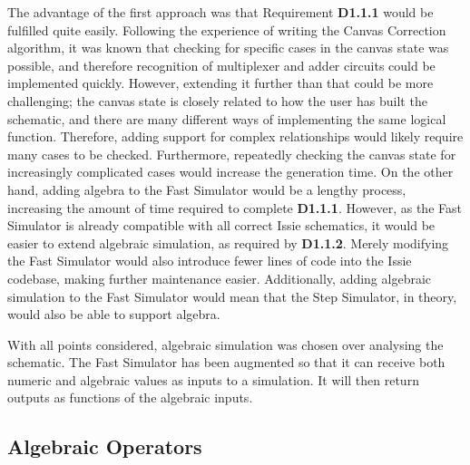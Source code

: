 The advantage of the first approach was that Requirement \textbf{D1.1.1} would be fulfilled quite easily. Following the experience of writing the Canvas Correction algorithm, it was known that checking for specific cases in the canvas state was possible, and therefore recognition of multiplexer and adder circuits could be implemented quickly. However, extending it further than that could be more challenging; the canvas state is closely related to how the user has built the schematic, and there are many different ways of implementing the same logical function. Therefore, adding support for complex relationships would likely require many cases to be checked. Furthermore, repeatedly checking the canvas state for increasingly complicated cases would increase the generation time. On the other hand, adding algebra to the Fast Simulator would be a lengthy process, increasing the amount of time required to complete \textbf{D1.1.1}. However, as the Fast Simulator is already compatible with all correct Issie schematics, it would be easier to extend algebraic simulation, as required by \textbf{D1.1.2}. Merely modifying the Fast Simulator would also introduce fewer lines of code into the Issie codebase, making further maintenance easier. Additionally, adding algebraic simulation to the Fast Simulator would mean that the Step Simulator, in theory, would also be able to support algebra. 

With all points considered, algebraic simulation was chosen over analysing the schematic. The Fast Simulator has been augmented so that it can receive both numeric and algebraic values as inputs to a simulation. It will then return outputs as functions of the algebraic inputs.

\subsection{Algebraic Operators}


